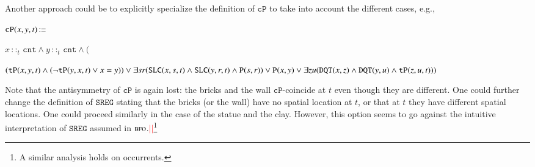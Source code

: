 \documentclass[ao]{iosart2x}
\newcommand{\nb}[1]{\textcolor{red}{$|$}\marginpar{\hspace*{-0cm}\parbox{20mm}{\scriptsize\raggedright\textcolor{red}{#1}}}}
\newcommand{\bflist}{\begin{list}{}{\setlength{\topsep}{2mm}\setlength{\parsep}{0mm}\setlength{\leftmargin}{9.2mm}\setlength{\labelwidth}{8mm}}}
\newcommand{\eflist}{\end{list}}
\newcommand{\dbThrLabel}{\textrm{t$_\texttt{db}$}}
\newcommand{\refdbth}[1]{({\dbThrLabel}\ref{#1})}
\newcommand{\pr}[1]{\mathtt{#1}}
\newcommand{\cn}[1]{\mathtt{#1}}
\newcommand\textequal{%
 \rule[.08ex]{5pt}{0.35pt}\llap{\rule[.78ex]{5pt}{0.35pt}}}
\newcommand{\sdef}{{\hspace{1.5pt}:\hspace{-2.5pt}\textequal\hspace{3pt}}}
\newcommand{\bfo}{{\textsc{bfo}}}
\newcommand {\TPd} {\ensuremath{\pr{tP}}}
\newcommand {\Pd} {\ensuremath{\pr{P}}}
\newcommand {\DQTd} {\ensuremath{\pr{DQT}}}
\newcommand {\SLCd} {\ensuremath{\pr{SLC}}}
\newcommand{\cntbcat}{\cn{cnt}}
\newcommand{\bfocpart}{\pr{cP}}
\newcommand{\bfoiof}[1]{{\,::_{#1\:\!}}}
\newcommand{\bfosregof}{\pr{SREG}}
\begin{document}
Another approach could be to explicitly specialize the definition of $\bfocpart$ to take into account the different cases, e.g.,  
\bflist
\item[] $\bfocpart(x,y,t) \sdef $\parbox[t]{\textwidth} {$x \bfoiof{t} \cntbcat \land y \bfoiof{t} \cntbcat \land 
($\parbox[t]{\textwidth} {$(\TPd(x,y,t) \land (\neg \TPd(y,x,t) \lor x=y)) \lor \\ 
\exists sr(\SLCd(x,s,t) \land \SLCd(y,r,t) \land \Pd(s,r)) \lor \\ 
\Pd(x,y) \lor \exists zu(\DQTd(x,z) \land \DQTd(y,u) \land \TPd(z,u,t)))$}}
\eflist
Note that the antisymmetry of $\bfocpart$ is again lost: the bricks and the wall $\bfocpart$-coincide at $t$ even though they are different. One could further change the definition of $\bfosregof$ stating that the bricks (or the wall) have no spatial location at $t$, or that at $t$ they have different spatial locations. One could proceed similarly in the case of the statue and the clay. However, this option seems to go against the intuitive interpretation of $\bfosregof$ assumed in $\bfo$.\nb{SB: cosa significa `too strong'? bisogna dire qualcosa di più}\nb{CM: modificato}\footnote{A similar analysis holds on occurrents.}%
\end{document}
